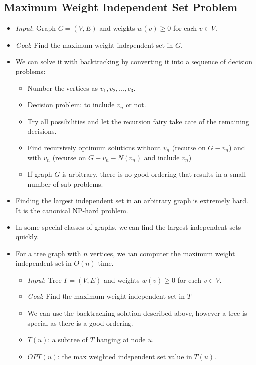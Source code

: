 \subsection{Maximum Weight Independent Set Problem}
\begin{itemize}
    \item \textit{Input}: Graph $G = (V, E)$ and weights $w(v) \geq 0$ for each $v \in V$.
    \item \textit{Goal}: Find the maximum weight independent set in $G$.
    \item We can solve it with backtracking by converting it into a sequence of decision problems:
    \begin{itemize}
        \item Number the vertices as $v_1, v_2, ..., v_3$.
        \item Decision problem: to include $v_n$ or not.
        \item Try all possibilities and let the recursion fairy take care of the remaining decisions.
        \item Find recursively optimum solutions without $v_n$ (recurse on $G - v_n$) and with $v_n$ (recurse on $G - v_n - N(v_n)$ and include $v_n$).
        \item If graph $G$ is arbitrary, there is no good ordering that results in a small number of sub-problems.
    \end{itemize}
    \item Finding the largest independent set in an arbitrary graph is extremely hard. It is the canonical NP-hard problem.
    \item In some special classes of graphs, we can find the largest independent sets quickly.
    \item For a tree graph with $n$ vertices, we can computer the maximum weight independent set in $O(n)$ time.
    \begin{itemize}
        \item \textit{Input}: Tree $T = (V, E)$ and weights $w(v) \geq 0$ for each $v \in V$.
        \item \textit{Goal}: Find the maximum weight independent set in $T$.
        \item We can use the backtracking solution described above, however a tree is special as there is a good ordering.
        \item $T(u)$: a subtree of $T$ hanging at node $u$.
        \item $OPT(u)$: the max weighted independent set value in $T(u)$.
        \begin{equation}

\end{equation}
\end{itemize}
\end{itemize}
